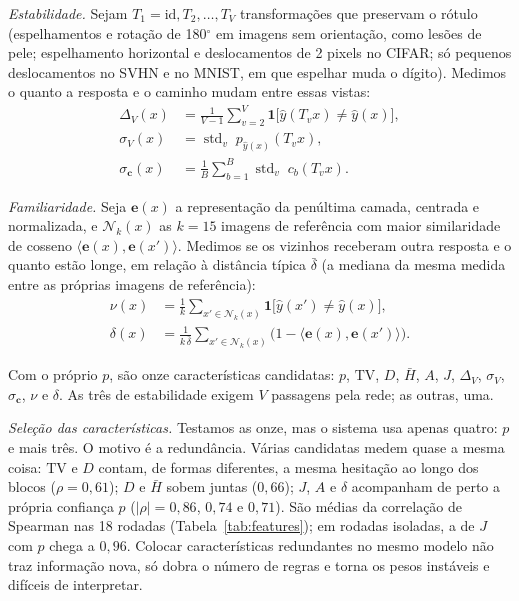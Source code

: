 \textit{Estabilidade.}
Sejam $T_1 = \mathrm{id}, T_2, \dots, T_V$ transformações que preservam o rótulo (espelhamentos e rotação de 180$^\circ$ em imagens sem
orientação, como lesões de pele; espelhamento horizontal e deslocamentos de 2 pixels no CIFAR; só pequenos deslocamentos no SVHN e no MNIST,
em que espelhar muda o dígito). Medimos o quanto a resposta e o caminho mudam entre essas vistas:
\begin{align}
  \Delta_V(x) &= \frac{1}{V-1}\sum_{v=2}^{V} \mathbf{1}\big[\hat y(T_v x) \ne \hat y(x)\big], \\
  \sigma_V(x) &= \operatorname{std}_{v}\; p_{\hat y(x)}(T_v x), \\
  \sigma_{\mathbf c}(x) &= \frac{1}{B}\sum_{b=1}^{B} \operatorname{std}_{v}\; c_b(T_v x).
\end{align}

\textit{Familiaridade.}
Seja $\mathbf{e}(x)$ a representação da penúltima camada, centrada e normalizada, e $\mathcal{N}_k(x)$ as $k=15$ imagens de referência com
maior similaridade de cosseno $\langle \mathbf{e}(x), \mathbf{e}(x') \rangle$. Medimos se os vizinhos receberam outra resposta e o quanto
estão longe, em relação à distância típica $\bar\delta$ (a mediana da mesma medida entre as próprias imagens de referência):
\begin{align}
  \nu(x) &= \frac{1}{k}\sum_{x' \in \mathcal{N}_k(x)} \mathbf{1}\big[\hat y(x') \ne \hat y(x)\big], \\
  \delta(x) &= \frac{1}{k\,\bar\delta}\sum_{x' \in \mathcal{N}_k(x)} \big(1 - \langle \mathbf{e}(x), \mathbf{e}(x') \rangle\big).
\end{align}

Com o próprio $p$, são onze características candidatas: $p$, $\mathrm{TV}$, $D$, $\bar H$, $A$, $J$, $\Delta_V$, $\sigma_V$, $\sigma_{\mathbf c}$,
$\nu$ e $\delta$. As três de estabilidade exigem $V$ passagens pela rede; as outras, uma.

\emph{Seleção das características.} Testamos as onze, mas o sistema usa apenas quatro: $p$ e mais três.
O motivo é a redundância. Várias candidatas medem quase a mesma coisa: $\mathrm{TV}$ e $D$ contam,
de formas diferentes, a mesma hesitação ao longo dos blocos ($\rho = 0{,}61$); $D$ e $\bar H$ sobem juntas ($0{,}66$);
$J$, $A$ e $\delta$ acompanham de perto a própria confiança $p$ ($|\rho| = 0{,}86$, $0{,}74$ e $0{,}71$). São médias da
correlação de Spearman nas 18 rodadas (Tabela~\ref{tab:features}); em rodadas isoladas, a de $J$ com $p$ chega a $0{,}96$. Colocar características redundantes
no mesmo modelo não traz informação nova, só dobra o número de regras e torna os pesos instáveis
e difíceis de interpretar.

